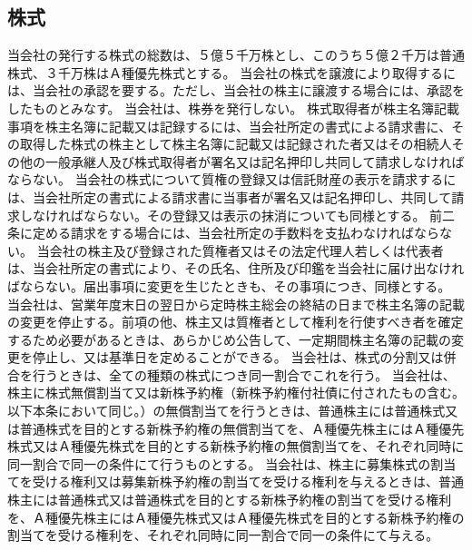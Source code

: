 \documentclass[10pt,a4paper,uplatex]{jsarticle}
\begin{document}
\subsection{株式}
当会社の発行する株式の総数は、５億５千万株とし、このうち５億２千万は普通株式、３千万株はＡ種優先株式とする。
当会社の株式を譲渡により取得するには、当会社の承認を要する。ただし、当会社の株主に譲渡する場合には、承認をしたものとみなす。
当会社は、株券を発行しない。
株式取得者が株主名簿記載事項を株主名簿に記載又は記録するには、当会社所定の書式による請求書に、その取得した株式の株主として株主名簿に記載又は記録された者又はその相続人その他の一般承継人及び株式取得者が署名又は記名押印し共同して請求しなければならない。
当会社の株式について質権の登録又は信託財産の表示を請求するには、当会社所定の書式による請求書に当事者が署名又は記名押印し、共同して請求しなければならない。その登録又は表示の抹消についても同様とする。
前二条に定める請求をする場合には、当会社所定の手数料を支払わなければならない。
当会社の株主及び登録された質権者又はその法定代理人若しくは代表者は、当会社所定の書式により、その氏名、住所及び印鑑を当会社に届け出なければならない。届出事項に変更を生じたときも、その事項につき、同様とする。
当会社は、営業年度末日の翌日から定時株主総会の終結の日まで株主名簿の記載の変更を停止する。前項の他、株主又は質権者として権利を行使すべき者を確定するため必要があるときは、あらかじめ公告して、一定期間株主名簿の記載の変更を停止し、又は基準日を定めることができる。
当会社は、株式の分割又は併合を行うときは、全ての種類の株式につき同一割合でこれを行う。
\term 当会社は、株主に株式無償割当て又は新株予約権（新株予約権付社債に付されたもの含む。以下本条において同じ。）の無償割当てを行うときは、普通株主には普通株式又は普通株式を目的とする新株予約権の無償割当てを、Ａ種優先株主にはＡ種優先株式又はＡ種優先株式を目的とする新株予約権の無償割当てを、それぞれ同時に同一割合で同一の条件にて行うものとする。
\term 当会社は、株主に募集株式の割当てを受ける権利又は募集新株予約権の割当てを受ける権利を与えるときは、普通株主には普通株式又は普通株式を目的とする新株予約権の割当てを受ける権利を、Ａ種優先株主にはＡ種優先株式又はＡ種優先株式を目的とする新株予約権の割当てを受ける権利を、それぞれ同時に同一割合で同一の条件にて与える。
\end{document}

